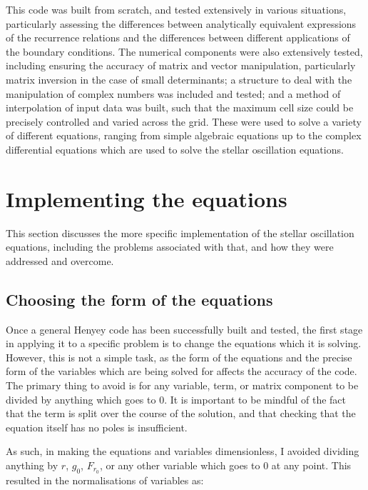 \documentclass[11pt]{amsart}
\begin{document}
This code was built from scratch, and tested extensively in various situations, particularly assessing the differences between analytically equivalent expressions of the recurrence relations and the differences between different applications of the boundary conditions.  The numerical components were also extensively tested, including ensuring the accuracy of matrix and vector manipulation, particularly matrix inversion in the case of small determinants; a structure to deal with the manipulation of complex numbers was included and tested; and a method of interpolation of input data was built, such that the maximum cell size could be precisely controlled and varied across the grid.  These were used to solve a variety of different equations, ranging from simple algebraic equations up to the complex differential equations which are used to solve the stellar oscillation equations.







\section{Implementing the equations}  \label{Implement}

This section discusses the more specific implementation of the stellar oscillation equations, including the problems associated with that, and how they were addressed and overcome.


\iffalse

\subsection{Choosing the form of the equations}  \label{Implement:Form}

Once a general Henyey code has been successfully built and tested, the first stage in applying it to a specific problem is to change the equations which it is solving.  However, this is not a simple task, as the form of the equations and the precise form of the variables which are being solved for affects the accuracy of the code.  The primary thing to avoid is for any variable, term, or matrix component to be divided by anything which goes to $0$.  It is important to be mindful of the fact that the term is split over the course of the solution, and that checking that the equation itself has no poles is insufficient.

As such, in making the equations and variables dimensionless, I avoided dividing anything by $r$, $g_{0}$, $F_{r_{0}}$, or any other variable which goes to $0$ at any point.  This resulted in the normalisations of variables as:
\end{document}
